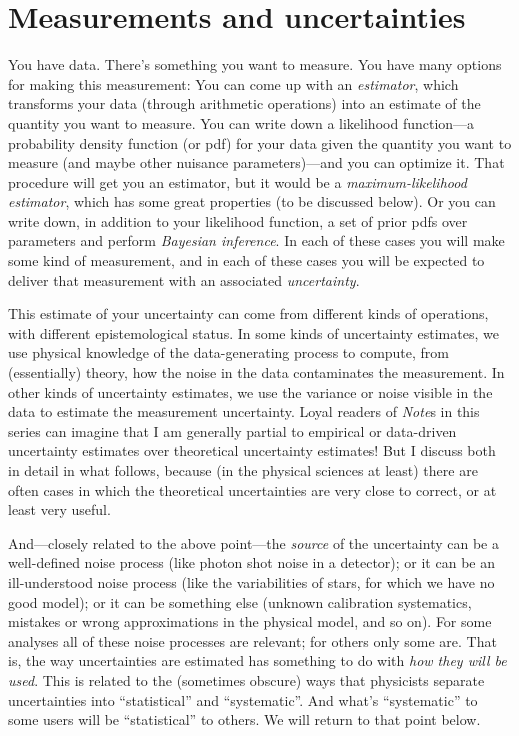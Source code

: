 \documentclass[10pt]{article}
\newcommand{\documentname}{\textsl{Note}}
\begin{document}
\section{Measurements and uncertainties}\label{sec:intro}

You have data. There's something you want to measure. You have many
options for making this measurement: You can come up with an
\textsl{estimator}, which transforms your data (through arithmetic
operations) into an estimate of the quantity you want to measure. You
can write down a likelihood function---a probability density function
(or pdf) for your data given the quantity you want to measure (and
maybe other nuisance parameters)---and you can optimize it. That
procedure will get you an estimator, but it would be a
\textsl{maximum-likelihood estimator}, which has some great
properties (to be discussed below).
Or you can write down, in addition to your likelihood
function, a set of prior pdfs over parameters and perform
\textsl{Bayesian inference}.  In each of these cases you will make
some kind of measurement, and in each of these cases you will be
expected to deliver that measurement with an associated \textsl{uncertainty}.

This estimate of your uncertainty can come from different kinds of operations, with
different epistemological status. In some kinds of uncertainty
estimates, we use physical knowledge of the data-generating process to
compute, from (essentially) theory, how the noise in the data
contaminates the measurement. In other kinds of uncertainty estimates,
we use the variance or noise visible in the data to estimate the measurement
uncertainty. Loyal readers of \documentname s in this series can imagine that
I am generally partial to empirical or data-driven uncertainty estimates over
theoretical uncertainty estimates! But I discuss both in detail in what follows,
because (in the physical sciences at least) there are often cases in which the
theoretical uncertainties are very close to correct, or at least very useful.

And---closely related to the above point---the \emph{source} of the
uncertainty can be a well-defined noise process (like photon shot
noise in a detector); or it can be an ill-understood noise process
(like the variabilities of stars, for which we have no good model); or
it can be something else (unknown calibration systematics, mistakes or
wrong approximations in the physical model, and so on). For some analyses
all of these noise processes are relevant; for others only some are.
That is, the way uncertainties are estimated has something to do with
\emph{how they will be used}. This is related to the (sometimes obscure)
ways that physicists separate uncertainties into ``statistical'' and ``systematic''.
And what's ``systematic'' to some users will be ``statistical'' to others.
We will return to that point below.
\end{document}
